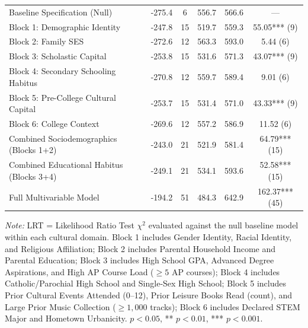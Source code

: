 \documentclass[12pt]{article}
\begin{document}
\begin{table}[htbp]
\begin{tabular*}{\linewidth}{@{\extracolsep{\fill}}lccccc@{}}
Baseline Specification (Null) & -275.4 & 6 & 556.7 & 566.6 & --- \\
\quad Block 1: Demographic Identity & -247.8 & 15 & 519.7 & 559.3 & 55.05*** (9) \\
\quad Block 2: Family SES & -272.6 & 12 & 563.3 & 593.0 & 5.44 (6) \\
\quad Block 3: Scholastic Capital & -253.8 & 15 & 531.6 & 571.3 & 43.07*** (9) \\
\quad Block 4: Secondary Schooling Habitus & -270.8 & 12 & 559.7 & 589.4 & 9.01 (6) \\
\quad Block 5: Pre-College Cultural Capital & -253.7 & 15 & 531.4 & 571.0 & 43.33*** (9) \\
\quad Block 6: College Context & -269.6 & 12 & 557.2 & 586.9 & 11.52 (6) \\
\quad Combined Sociodemographics (Blocks 1+2) & -243.0 & 21 & 521.9 & 581.4 & 64.79*** (15) \\
\quad Combined Educational Habitus (Blocks 3+4) & -249.1 & 21 & 534.1 & 593.6 & 52.58*** (15) \\
\quad Full Multivariable Model & -194.2 & 51 & 484.3 & 642.9 & 162.37*** (45) \\
\bottomrule
\end{tabular*}
\begin{minipage}{\linewidth}
\vspace{4pt}
\footnotesize
\textit{Note:} LRT = Likelihood Ratio Test $\chi^2$ evaluated against the null baseline model within each cultural domain. Block 1 includes Gender Identity, Racial Identity, and Religious Affiliation; Block 2 includes Parental Household Income and Parental Education; Block 3 includes High School GPA, Advanced Degree Aspirations, and High AP Course Load ($\ge 5$ AP courses); Block 4 includes Catholic/Parochial High School and Single-Sex High School; Block 5 includes Prior Cultural Events Attended (0--12), Prior Leisure Books Read (count), and Large Prior Music Collection ($\ge 1,000$ tracks); Block 6 includes Declared STEM Major and Hometown Urbanicity. \newline * $p < 0.05$, ** $p < 0.01$, *** $p < 0.001$.
\end{minipage}
\end{table}
\end{document}
